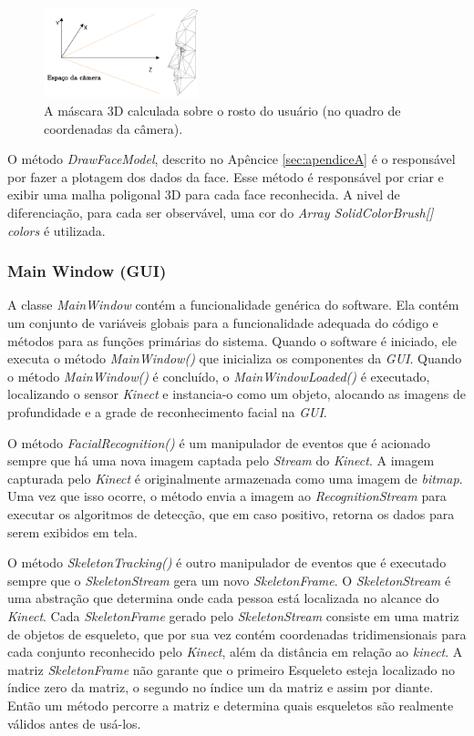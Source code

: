 \begin{figure}[ht]
\centering
\includegraphics[width=0.4\textwidth]{images/3dface.png}
\caption{A máscara 3D calculada sobre o rosto do usuário (no quadro de coordenadas da câmera).}
\label{fig:3dfaces}
\end{figure}

O método \textit{DrawFaceModel}, descrito no Apêncice \ref{sec:apendiceA} é o responsável por fazer a plotagem dos dados da face. Esse método é responsável por criar e exibir uma malha poligonal 3D para cada face reconhecida. A nivel de diferenciação, para cada ser observável, uma cor do \textit{Array SolidColorBrush[] colors} é utilizada.


\subsubsection{Main Window (GUI)}\label{sec:mainWindow}

A classe \textit{MainWindow} contém a funcionalidade genérica do software. Ela contém um conjunto de variáveis globais para a funcionalidade adequada do código e métodos para as funções primárias do sistema. Quando o software é iniciado, ele executa o método \textit{MainWindow()} que inicializa os componentes da \textit{GUI}. Quando o método \textit{MainWindow()} é concluído, o \textit{MainWindowLoaded()} é executado, localizando o sensor \textit{Kinect} e instancia-o como um objeto, alocando as imagens de profundidade e a grade de reconhecimento facial na \textit{GUI}.

O método \textit{FacialRecognition()} é um manipulador de eventos que é acionado sempre que há uma nova imagem captada pelo \textit{Stream} do \textit{Kinect}. A imagem capturada pelo \textit{Kinect} é originalmente armazenada como uma imagem de \textit{bitmap}. Uma vez que isso ocorre, o método envia a imagem ao \textit{RecognitionStream} para executar os algoritmos de detecção, que em caso positivo, retorna os dados para serem exibidos em tela.

O método \textit{SkeletonTracking()} é outro manipulador de eventos que é executado sempre que o \textit{SkeletonStream} gera um novo \textit{SkeletonFrame}. O \textit{SkeletonStream} é uma abstração que determina onde cada pessoa está localizada no alcance do \textit{Kinect}. Cada \textit{SkeletonFrame} gerado pelo \textit{SkeletonStream} consiste em uma matriz de objetos de esqueleto, que por sua vez contém coordenadas tridimensionais para cada conjunto reconhecido pelo \textit{Kinect}, além da distância em relação ao \textit{kinect}. A matriz \textit{SkeletonFrame} não garante que o primeiro Esqueleto esteja localizado no índice zero da matriz, o segundo no índice um da matriz e assim por diante. Então um método percorre a matriz e determina quais esqueletos são realmente válidos antes de usá-los.

